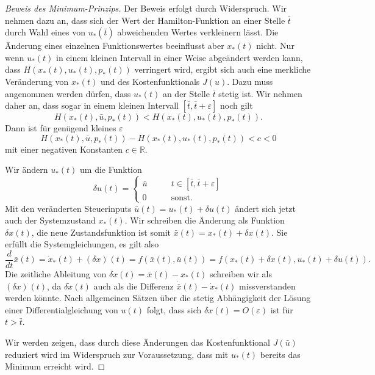 \begin{proof}[Beweis des Minimum-Prinzips]
Der Beweis erfolgt durch Widerspruch.
Wir nehmen dazu an, dass sich der Wert der Hamilton-Funktion an einer
Stelle $\bar{t}$ durch Wahl eines von $u_*(\bar{t})$ abweichenden Wertes
verkleinern lässt.
Die Änderung eines einzelnen Funktionswertes beeinflusst aber $x_*(t)$ nicht.
Nur wenn $u_*(t)$ in einem kleinen Intervall in einer Weise abgeändert
werden kann, dass $H(x_*(t),u_*(t),p_*(t))$ verringert wird, ergibt sich
auch eine merkliche Veränderung von $x_*(t)$ und des Kostenfunktionals $J(u)$.
Dazu muss angenommen werden dürfen, dass $u_*(t)$ an der Stelle $\bar{t}$
stetig ist.
Wir nehmen daher an, dass sogar in einem kleinen Intervall 
$[\bar{t},\bar{t}+\varepsilon]$ noch gilt
\[
H(x_*(t),\bar{u},p_*(t)) < H(x_*(t), u_*(t), p_*(t)).
\]
Dann ist für genügend kleines $\varepsilon$
\begin{equation}
H(x_*(t),\bar{u},p_*(t)) - H(x_*(t),u_*(t),p_*(t)) < c < 0
\label{buch:hamiltonjacobi:oc:eqn:Hunterschied}
\end{equation}
mit einer negativen Konstanten $c\in\mathbb{R}$.

Wir ändern $u_*(t)$ um die Funktion
\[
\delta u(t)
=
\begin{cases}
\bar{u}&\qquad t\in [\bar{t},\bar{t}+\varepsilon] \\
0      &\qquad\text{sonst}.
\end{cases}
\]
Mit den veränderten Steuerinputs $\bar{u}(t) = u_*(t) + \delta u(t)$ ändert
sich jetzt auch der Systemzustand $x_*(t)$.
Wir schreiben die Änderung als Funktion $\delta x(t)$, die neue
Zustandsfunktion ist somit $\bar{x}(t) = x_*(t)+\delta x(t)$.
Sie erfüllt die Systemgleichungen, es gilt also
\[
\frac{d}{dt}\bar{x}(t)
=
\dot{x}_*(t) + (\delta x)^{\dot{}}(t)
=
f(\bar{x}(t),\bar{u}(t))
=
f(x_*(t)+\delta x(t), u_*(t)+\delta u(t)).
\]
Die zeitliche Ableitung von $\delta x(t)=\bar{x}(t)-x_*(t)$ schreiben wir als
$(\delta x)^{\dot{}}(t)$, da $\delta\dot{x}(t)$ auch als die Differenz
$\dot{\bar{x}}(t)-\dot{x}_*(t)$ missverstanden werden könnte.
Nach allgemeinen Sätzen über die stetig Abhängigkeit der Lösung einer
Differentialgleichung von $u(t)$ folgt, dass sich
$\delta x(t)=O(\varepsilon)$ ist für $t>\bar{t}$.

Wir werden zeigen, dass durch diese Änderungen das Kostenfunktional
$J(\bar{u})$ reduziert wird im Widerspruch zur Voraussetzung, dass 
mit $u_*(t)$ bereits das Minimum erreicht wird.


\end{proof}
